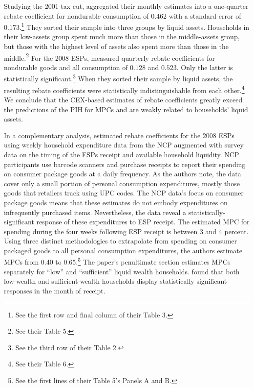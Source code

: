 \documentclass[fleqccn,12pt]{article}
\begin{document}
Studying the 2001 tax cut, \citeauthor*{aer2006JohnsonParkerSouleles} aggregated their monthly estimates into a one-quarter rebate coefficient for nondurable consumption of $0.462$ with a standard error of $0.173$.\footnote{See the first row and final column of their Table 3.} They sorted their sample into three groups by liquid assets. Households in their low-assets group spent much more than those in the middle-assets group, but those with the highest level of assets also spent more than those in the middle.\footnote{See their Table 5.}  For the 2008 ESPs, \citeauthor*{aer2013ParkerSoulelesJohnsonMcClelland} measured quarterly rebate coefficients for nondurable goods and all consumption of $0.128$ and $0.523$. Only the latter is statistically significant.\footnote{See the third row of their Table 2.} When they sorted their sample by liquid assets, the resulting rebate coefficients were statistically indistinguishable from each other.\footnote{See their Table 6.} We conclude that the CEX-based estimates of rebate coefficients greatly exceed the predictions of the PIH for MPCs and are weakly related to households' liquid assets. 

In a complementary analysis,  \cite{jme2014BrodaParker} estimated rebate coefficients for the 2008 ESPs using weekly household expenditure data from the NCP augmented with survey data on the timing of the ESPs receipt and available household liquidity. NCP participants use barcode scanners and purchase receipts to report their spending on consumer package goods at a daily frequency. As the authors note, the data cover only a small portion of personal consumption expenditures, mostly those goods that retailers track using UPC codes. The NCP data's focus on consumer package goods means that these estimates do not embody expenditures on infrequently purchased items. Nevertheless, the data reveal a statistically-significant response of these expenditures to ESP receipt. The estimated MPC for spending during the four weeks following ESP receipt is between 3 and 4 percent. Using three distinct methodologies to extrapolate from spending on consumer packaged goods to all personal consumption expenditures, the authors estimate MPCs from $0.40$ to $0.65$.\footnote{See the first lines of their Table 5's Panels A and B.}  The paper's penultimate section estimates MPCs separately for ``low'' and ``sufficient'' liquid wealth households.  \citeauthor*{jme2014BrodaParker} found that both low-wealth and sufficient-wealth households display statistically significant responses in the month of receipt. 
\end{document}
